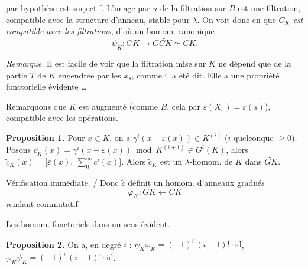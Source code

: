 \documentclass[11pt,a4paper]{article}
\begin{document}

\ill{} par hypothèse est surjectif. L'image par $u$ de la filtration
 sur $B$ est une filtration, compatible avec la structure
d'anneau, stable pour $\lambda$. On voit donc en  que
\emph{$\widetilde{C}_{K}$ est compatible avec les filtrations}, d'où un
homom. canonique
\[
  \psi_{K} : GK \longrightarrow G\widetilde{CK} \simeq CK .
\]

\emph{Remarque.} Il est facile de voir que la filtration mise sur $K$ ne
dépend que de la partie $T$ de $K$ engendrée par les $x_{s}$, comme il a été
dit. Elle a une propriété fonctorielle évidente \ldots

Remarquons que $K$ est augmenté (comme $B$, cela par
$\varepsilon(X_{s}) = \varepsilon(s)$), compatible avec les opérations.

\textbf{Proposition 1.} Pour $x \in K$, on a
$\gamma^{i}(x - \varepsilon(x)) \in K^{(i)}$ ($i$ quelconque $\geqslant 0$).
Posons $c^{i}_{K}(x) = \gamma^{i}(x - \varepsilon(x)) \bmod K^{(i+1)} \in G^{i}(K)$,
alors $\widetilde{c}_{K}(x) = \bigl[\varepsilon(x),\ \sum_{0}^{\infty} c^{i}(x)\bigr]$.
Alors $\widetilde{c}_{K}$ est un $\lambda$-homom. de $K$ dans $\widetilde{GK}$.

Vérification immédiate. / Donc $\widetilde{c}$ définit un homom. d'anneaux
gradués
\[
  \varphi_{K} : GK \longleftarrow CK
\]
rendant commutatif


Les homom.   fonctoriels dans un
sens évident.

\textbf{Proposition 2.}  On a, en degré $i$ :
$\psi_{K}\varphi_{K} = (-1)^{i}\,(i-1)! \cdot \mathrm{id}$, \quad
$\varphi_{K}\psi_{K} = (-1)^{i}\,(i-1)! \cdot \mathrm{id}$.
\end{document}
